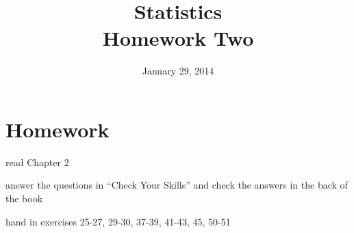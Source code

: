 \documentclass[letterpaper, landscape]{exam}
\author{}
\date{January 29, 2014}
\title{Statistics \\ Homework Two}
\begin{document}
  \maketitle

  \section{Homework}

  \ifprintanswers
  \else
    \begin{itemize*}
      \item read Chapter 2 
      \item answer the questions in ``Check Your Skills'' and check the answers
        in the back of the book
      \item hand in exercises 25-27, 29-30, 37-39, 41-43, 45, 50-51
    \end{itemize*}
  \fi
\end{document}

